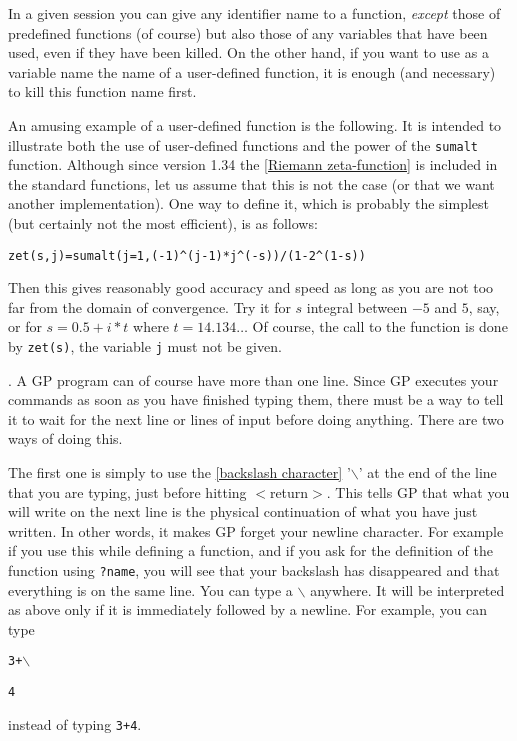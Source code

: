 In a given session you can give any identifier name to a function, {\sl except}
those of predefined functions (of course) but also those of any variables that
have been used, even if they have been killed. On the other hand, if you want
to use as a variable name the name of a user-defined function, it is enough
(and necessary) to kill this function name first.

An amusing example of a user-defined function is the following. It is intended
to illustrate both the use of
user-defined functions and the power of the {\tt sumalt} function. Although
since version 1.34 the \ref{Riemann zeta-function} is included in the standard
functions, let us assume that this is not the case (or that we want another
implementation). One way to define it, which is probably the simplest
(but certainly not the most efficient), is as follows:

{\tt zet(s,j)=sumalt(j=1,(-1)\^{}(j-1)*j\^{}(-s))/(1-2\^{}(1-s))}

Then this gives reasonably good accuracy and speed as long as you are not too far
from the domain of convergence. Try it for $s$ integral between $-5$ and $5$, say,
or for $s=0.5+i*t$ where $t=14.134\dots$ Of course, the call to the function is
done by {\tt zet(s)}, the variable {\tt j} must not be given.

. A GP program can of course have more than
one line. Since GP executes your commands as soon as you have finished typing them, there
must be a way to tell it to wait for the next line or lines of input before doing
anything. There are two ways of doing this.

The first one is simply to use the \ref{backslash character} '$\backslash$' at the end of the
line that you are typing, just before hitting $<$return$>$. This tells GP that what you
will write on the next line is the physical continuation of what you have just written.
In other words, it makes GP forget your newline character. For example if you use this
while defining a function, and if you ask for the definition of the function using
{\tt ?name}, you will see that your backslash has disappeared and that everything is on
the same line. You can type a $\backslash$ anywhere. It will be interpreted as above
only if it is immediately followed by a newline. For example, you can type

{\tt 3+$\backslash$}

{\tt 4}

instead of typing {\tt 3+4}.

